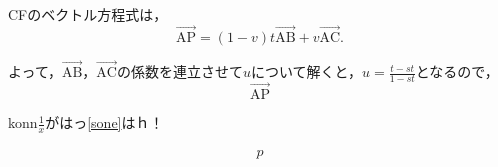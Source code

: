 \documentclass[uplatex,dvipdfmx,a4paper,9pt]{jsarticle}
\begin{document}
CFのベクトル方程式は，
\begin{equation}
    \overrightarrow{\mathrm{AP}} = (1-v)t \overrightarrow{\mathrm{AB}} + v \overrightarrow{\mathrm{AC}}.
\end{equation}

よって，$\overrightarrow{\mathrm{AB}}$，$\overrightarrow{\mathrm{AC}}$の係数を連立させて$u$について解くと，$\displaystyle u = \frac{t-st}{1-st} $となるので，
\begin{equation}
    \overrightarrow{\mathrm{AP}}
\end{equation}

konn$ \displaystyle \frac{1}{x} $がはっ\ref{sone}はｈ！

\begin{align}
    p
\end{align}
\end{document}
